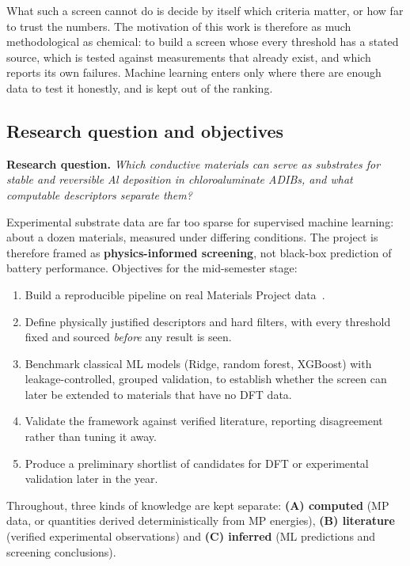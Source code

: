 \documentclass{report}
\begin{document}
What such a screen cannot do is decide by itself which criteria matter, or how far to trust the numbers. The motivation of this work is therefore as much methodological as chemical: to build a screen whose every threshold has a stated source, which is tested against measurements that already exist, and which reports its own failures. Machine learning enters only where there are enough data to test it honestly, and is kept out of the ranking.

\subsection{Research question and objectives}
\noindent\textbf{Research question.} \emph{Which conductive materials can serve as substrates for stable and reversible Al deposition in chloroaluminate ADIBs, and what computable descriptors separate them?}

\noindent Experimental substrate data are far too sparse for supervised machine learning: about a dozen materials, measured under differing conditions. The project is therefore framed as \textbf{physics-informed screening}, not black-box prediction of battery performance. Objectives for the mid-semester stage:
\begin{enumerate}[leftmargin=*,itemsep=2pt]
\item Build a reproducible pipeline on real Materials Project data~\citep{Jain2013}.
\item Define physically justified descriptors and hard filters, with every threshold fixed and sourced \emph{before} any result is seen.
\item Benchmark classical ML models (Ridge, random forest, XGBoost) with leakage-controlled, grouped validation, to establish whether the screen can later be extended to materials that have no DFT data.
\item Validate the framework against verified literature, reporting disagreement rather than tuning it away.
\item Produce a preliminary shortlist of candidates for DFT or experimental validation later in the year.
\end{enumerate}

\noindent Throughout, three kinds of knowledge are kept separate: \textbf{(A) computed} (MP data, or quantities derived deterministically from MP energies), \textbf{(B) literature} (verified experimental observations) and \textbf{(C) inferred} (ML predictions and screening conclusions).
\end{document}
